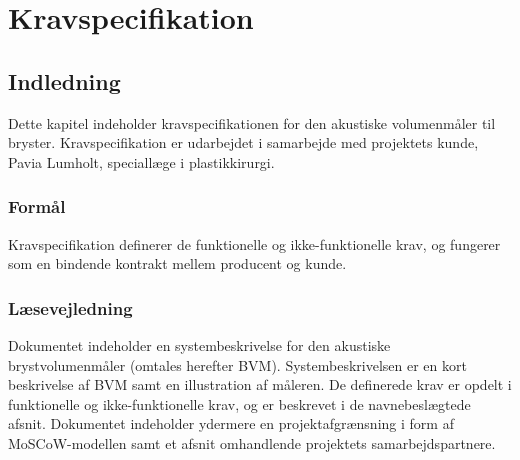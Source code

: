 



\section{Kravspecifikation}
	\subsection{Indledning}
	
	Dette kapitel indeholder kravspecifikationen for den akustiske volumenmåler til bryster. Kravspecifikation er udarbejdet i samarbejde med projektets kunde, Pavia Lumholt, speciallæge i plastikkirurgi. 
	  
		\subsubsection{Formål}
	
		Kravspecifikation definerer de funktionelle og ikke-funktionelle krav, og fungerer som en bindende kontrakt mellem producent og kunde.
	
		\subsubsection{Læsevejledning}	
		Dokumentet indeholder en systembeskrivelse for den akustiske brystvolumenmåler (omtales herefter BVM). Systembeskrivelsen er en kort beskrivelse af BVM samt en illustration af måleren. De definerede krav er opdelt i funktionelle og ikke-funktionelle krav, og er beskrevet i de navnebeslægtede afsnit. Dokumentet indeholder ydermere en projektafgrænsning i form af MoSCoW-modellen samt et afsnit omhandlende projektets samarbejdspartnere.
	
